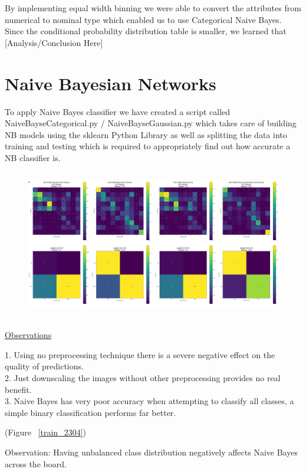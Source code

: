 \documentclass[11pt]{article}
\begin{document}
By implementing equal width binning we were able to convert the attributes from numerical to nominal type which enabled us to use Categorical Naive Bayes. 
Since the conditional probability distribution table is smaller, we learned that {\huge [Analysis/Conclusion Here]}

\pagebreak

\section{Naive Bayesian Networks}
To apply Naive Bayes classifier we have created a script called NaiveBayseCategorical.py 
/ NaiveBayseGaussian.py which takes care of building NB models using the sklearn Python Library
as well as splitting the data into training and testing which is required to appropriately find 
out how accurate a NB classifier is.
\par 
\subsection{}\label{NaiveBayesEWBConfMat}
\begin{figure}[h!]
  \centering
  \includegraphics[scale=0.15]{Images/NaiveBayesEWBMatrices.png}
\end{figure}
{\color{red}{\large IMAGE NEEDS RESIZING TO READ TEXT}}
\\
\underline{Observations}
\par
1. Using no preprocessing technique there is a severe negative effect on the quality of predictions. \\
2. Just downscaling the images without other preprocessing provides no real benefit. \\
3. Naive Bayes has very poor accuracy when attempting to classify all classes, a simple binary classification performs far better.

\par
(Figure ~\ref{train_2304})
\par
Observation: Having unbalanced class distribution negatively affects Naive Bayes across the board.
\end{document}
